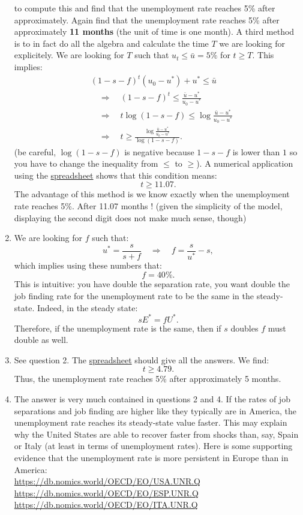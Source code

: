 \documentclass[]{book}
\theoremstyle{definition}
\theoremstyle{definition}
\theoremstyle{definition}
\theoremstyle{remark}
\begin{document}
\begin{enumerate}
  to compute this and find that the unemployment rate reaches 5\% after
  approximately. Again find that the unemployment rate reaches 5\% after
  approximately \textbf{11 months} (the unit of time is one month). A
  third method is to in fact do all the algebra and calculate the time
  \(T\) we are looking for explicitely. We are looking for \(T\) such
  that \(u_t \leq \bar{u}=5\%\) for \(t \geq T\). This implies: \[
  \begin{aligned}
  &(1-s-f)^t\left(u_0-u^{*}\right) + u^{*} \leq \bar{u}\\
  &\quad \Rightarrow \quad (1-s-f)^t \leq \frac{\bar{u}-u^{*}}{u_0 - u^{*}} \\
  & \quad \Rightarrow \quad t  \log(1-s-f) \leq \log\frac{\bar{u}-u^{*}}{u_0 - u^{*}} \\
  & \quad \Rightarrow \quad t   \geq \frac{\log\frac{\bar{u}-u^{*}}{u_0 - u^{*}}}{\log(1-s-f)}.
  \end{aligned}
  \] (be careful, \(\log(1-s-f)\) is negative because \(1-s-f\) is lower
  than \(1\) so you have to change the inequality from \(\leq\) to
  \(\geq\)). A numerical application using the
  \href{https://docs.google.com/spreadsheets/d/1h9JJD8K2_IE166gdj78waf0zu4YDY9Rp3r5oiJR_06s/edit?usp=sharing}{spreadsheet}
  shows that this condition means: \[t \geq 11.07.\] The advantage of
  this method is we know exactly when the unemployment rate reaches 5\%.
  After 11.07 months ! (given the simplicity of the model, displaying
  the second digit does not make much sense, though)
\item
  We are looking for \(f\) such that:
  \[u^{*}=\frac{s}{s+f}\quad \Rightarrow \quad f=\frac{s}{u^{*}}-s,\]
  which implies using these numbers that: \[f=40\%.\] This is intuitive:
  you have double the separation rate, you want double the job finding
  rate for the unemployment rate to be the same in the steady-state.
  Indeed, in the steady state: \[s E^{*}=f U^{*}.\] Therefore, if the
  unemployment rate is the same, then if \(s\) doubles \(f\) must double
  as well.
\item
  See question 2. The
  \href{https://docs.google.com/spreadsheets/d/1h9JJD8K2_IE166gdj78waf0zu4YDY9Rp3r5oiJR_06s/edit?usp=sharing}{spreadsheet}
  should give all the answers. We find: \[t \geq 4.79.\] Thus, the
  unemployment rate reaches 5\% after approximately 5 months.
\item
  The answer is very much contained in questions 2 and 4. If the rates
  of job separations and job finding are higher like they typically are
  in America, the unemployment rate reaches its steady-state value
  faster. This may explain why the United States are able to recover
  faster from shocks than, say, Spain or Italy (at least in terms of
  unemployment rates). Here is some supporting evidence that the
  unemployment rate is more persistent in Europe than in America:\\
  \url{https://db.nomics.world/OECD/EO/USA.UNR.Q}\\
  \url{https://db.nomics.world/OECD/EO/ESP.UNR.Q}\\
  \url{https://db.nomics.world/OECD/EO/ITA.UNR.Q}
\end{enumerate}
\end{document}
